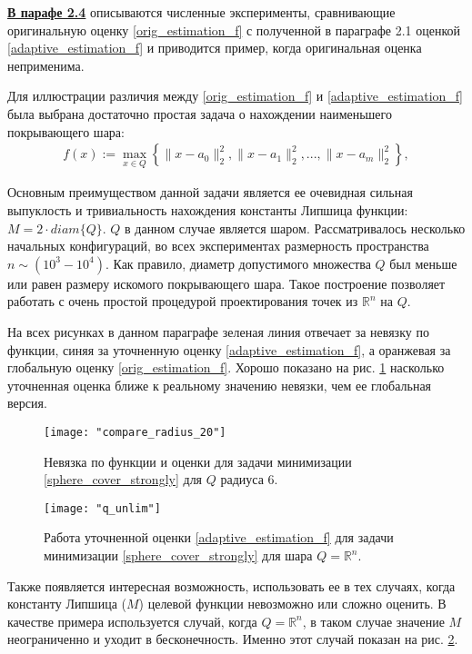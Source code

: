 \underline{\textbf{В парафе 2.4}} описываются численные эксперименты, сравнивающие оригинальную оценку \eqref{orig_estimation_f} с полученной в параграфе 2.1 оценкой \eqref{adaptive_estimation_f} и приводится пример, когда оригинальная оценка неприменима. 

Для иллюстрации различия между \eqref{orig_estimation_f} и \eqref{adaptive_estimation_f} была выбрана достаточно простая задача о нахождении наименьшего покрывающего шара:
\begin{gather}\label{sphere_cover_strongly}
    f(x) := \max_{x\in Q}\left\{\|x - a_0\|_2^2, \|x - a_1\|_2^2, ..., \|x - a_m\|_2^2\right\},
\end{gather}

Основным преимуществом данной задачи является ее очевидная сильная выпуклость и тривиальность нахождения константы Липшица функции: $ M = 2 \cdot diam\{Q\} $. $Q$ в данном случае является шаром.
Рассматривалось несколько начальных конфигураций, во всех экспериментах размерность пространства $n \sim (10^3 - 10^4)$. Как правило, диаметр допустимого множества $Q$ был меньше или равен размеру искомого покрывающего шара. Такое построение позволяет работать с очень простой процедурой проектирования точек из $\mathbb{R}^n$ на $Q$.

На всех рисунках в данном параграфе зеленая линия отвечает за невязку по функции, синяя за уточненную оценку \eqref{adaptive_estimation_f}, а оранжевая за глобальную оценку \eqref{orig_estimation_f}. Хорошо показано на рис. \ref{r_20_q_6} насколько уточненная оценка ближе к реальному значению невязки, чем ее глобальная версия. 

\begin{figure}[h]
	\centering
	\texttt{[image: "compare\_radius\_20"]}
    \caption{Невязка по функции и оценки для задачи минимизации \eqref{sphere_cover_strongly} для $Q$ радиуса 6.}
    \label{r_20_q_6}
\end{figure}

\begin{figure}[h]
	\centering
	\texttt{[image: "q\_unlim"]}
    \caption{Работа уточненной оценки \eqref{adaptive_estimation_f} для задачи минимизации \eqref{sphere_cover_strongly} для шара $Q = \mathbb{R}^n$.}
    \label{q_unlim}
\end{figure}

Также появляется интересная возможность, использовать ее в тех случаях, когда константу Липшица ($M$) целевой функции невозможно или сложно оценить. В качестве примера используется случай, когда $Q = \mathbb{R}^n$, в таком случае значение $M$ неограниченно и уходит в бесконечность. Именно этот случай показан на рис. \ref{q_unlim}. 

